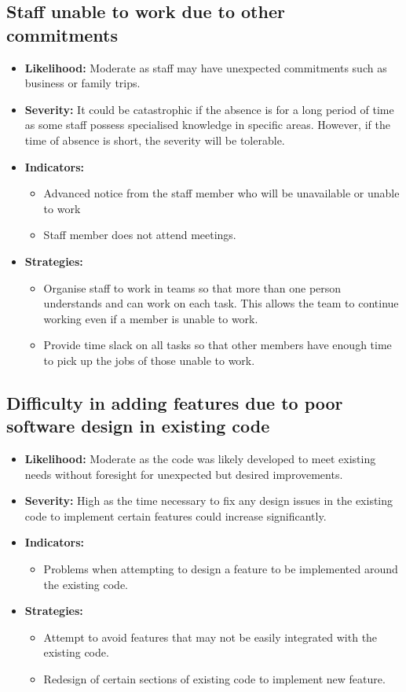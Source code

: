 \documentclass{article}
\begin{document}
\subsection{Staff unable to work due to other commitments}
\begin{itemize}
	\item \textbf{Likelihood:} Moderate as staff may have unexpected commitments such as business or family trips.
	\item \textbf{Severity:} It could be catastrophic if the absence is for a long period of time as some staff possess specialised knowledge in specific areas. However, if the time of absence is short, the severity will be tolerable.
	\item \textbf{Indicators:}
		\begin{itemize}
			\item Advanced notice from the staff member who will be unavailable or unable to work  
			\item Staff member does not attend meetings.
		\end{itemize}
	\item \textbf{Strategies:} 
		\begin{itemize}
			\item Organise staff to work in teams so that more than one person understands and can work on each task. This allows the team to continue working even if a member is unable to work.
			\item Provide time slack on all tasks so that other members have enough time to pick up the jobs of those unable to work.
		\end{itemize}
\end{itemize}

\subsection{Difficulty in adding features due to poor software design in existing code}
\begin{itemize}
	\item \textbf{Likelihood:} Moderate as the code was likely developed to meet existing needs without foresight for unexpected but desired improvements.
	\item \textbf{Severity:} High as the time necessary to fix any design issues in the existing code to implement certain features could increase significantly.
	\item \textbf{Indicators:}
		\begin{itemize}
			\item Problems when attempting to design a feature to be implemented around the existing code.
		\end{itemize}
	\item \textbf{Strategies:} 
		\begin{itemize}
			\item Attempt to avoid features that may not be easily integrated with the existing code.
			\item Redesign of certain sections of existing code to implement new feature.
		\end{itemize}
\end{itemize}
\end{document}
